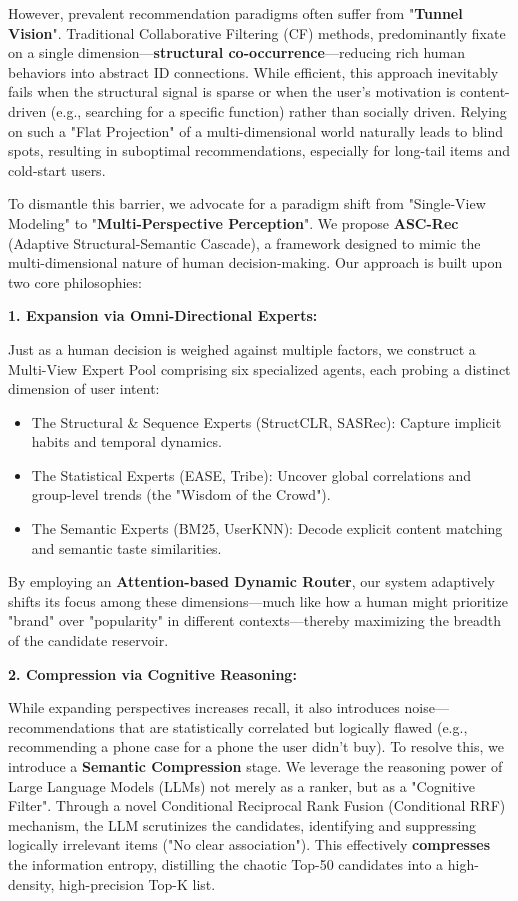 \documentclass[]{article}
\begin{document}
However, prevalent recommendation paradigms often suffer from
"\textbf{Tunnel Vision}". Traditional Collaborative Filtering (CF)
methods, predominantly fixate on a single dimension---\textbf{structural
co-occurrence}---reducing rich human behaviors into abstract ID
connections. While efficient, this approach inevitably fails when the
structural signal is sparse or when the user's motivation is
content-driven (e.g., searching for a specific function) rather than
socially driven. Relying on such a "Flat Projection" of a
multi-dimensional world naturally leads to blind spots, resulting in
suboptimal recommendations, especially for long-tail items and
cold-start users.

To dismantle this barrier, we advocate for a paradigm shift from
"Single-View Modeling" to "\textbf{Multi-Perspective Perception}". We
propose \textbf{ASC-Rec} (Adaptive Structural-Semantic Cascade), a
framework designed to mimic the multi-dimensional nature of human
decision-making. Our approach is built upon two core philosophies:

\textbf{1. Expansion via Omni-Directional Experts:}

Just as a human decision is weighed against multiple factors, we
construct a Multi-View Expert Pool comprising six specialized agents,
each probing a distinct dimension of user intent:

\begin{itemize}
\item
  The Structural \& Sequence Experts (StructCLR, SASRec): Capture
  implicit habits and temporal dynamics.
\item
  The Statistical Experts (EASE, Tribe): Uncover global correlations and
  group-level trends (the "Wisdom of the Crowd").
\item
  The Semantic Experts (BM25, UserKNN): Decode explicit content matching
  and semantic taste similarities.
\end{itemize}

By employing an \textbf{Attention-based Dynamic Router}, our system
adaptively shifts its focus among these dimensions---much like how a
human might prioritize "brand" over "popularity" in different
contexts---thereby maximizing the breadth of the candidate reservoir.

\textbf{2. Compression via Cognitive Reasoning:}

While expanding perspectives increases recall, it also introduces
noise---recommendations that are statistically correlated but logically
flawed (e.g., recommending a phone case for a phone the user didn't
buy). To resolve this, we introduce a \textbf{Semantic Compression}
stage. We leverage the reasoning power of Large Language Models (LLMs)
not merely as a ranker, but as a "Cognitive Filter". Through a novel
Conditional Reciprocal Rank Fusion (Conditional RRF) mechanism, the LLM
scrutinizes the candidates, identifying and suppressing logically
irrelevant items ("No clear association"). This effectively
\textbf{compresses} the information entropy, distilling the chaotic
Top-50 candidates into a high-density, high-precision Top-K list.
\end{document}
